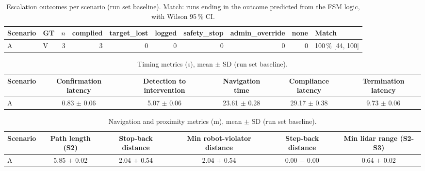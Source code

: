 
\begin{table}[t]\centering\small
\caption{Escalation outcomes per scenario (run set baseline). Match: runs ending in the outcome predicted from the FSM logic, with Wilson 95\,\% CI.}
\begin{tabular}{llrrrrrrrl}
\toprule
Scenario & GT & $n$ & complied & target\_lost & logged & safety\_stop & admin\_override & none & Match \\
\midrule
A & V & 3 & 3 & 0 & 0 & 0 & 0 & 0 & 100\,\% [44, 100] \\
\bottomrule
\end{tabular}
\end{table}
\begin{table}[t]\centering\small
\caption{Timing metrics (s), mean $\pm$ SD (run set baseline).}
\begin{tabular}{lccccc}
\toprule
Scenario & Confirmation latency & Detection to intervention & Navigation time & Compliance latency & Termination latency \\
\midrule
A & 0.83 $\pm$ 0.06 & 5.07 $\pm$ 0.06 & 23.61 $\pm$ 0.28 & 29.17 $\pm$ 0.38 & 9.73 $\pm$ 0.06 \\
\bottomrule
\end{tabular}
\end{table}
\begin{table}[t]\centering\small
\caption{Navigation and proximity metrics (m), mean $\pm$ SD (run set baseline).}
\begin{tabular}{lccccc}
\toprule
Scenario & Path length (S2) & Stop-back distance & Min robot-violator distance & Step-back distance & Min lidar range (S2-S3) \\
\midrule
A & 5.85 $\pm$ 0.02 & 2.04 $\pm$ 0.54 & 2.04 $\pm$ 0.54 & 0.00 $\pm$ 0.00 & 0.64 $\pm$ 0.02 \\
\bottomrule
\end{tabular}
\end{table}

